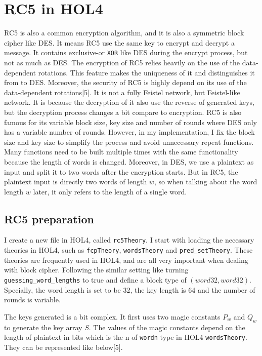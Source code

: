 \documentclass{article}
\begin{document}
\section{RC5 in HOL4}
RC5 is also a common encryption algorithm, and it is also a symmetric block cipher like DES. It means RC5 use the same key
to encrypt and decrypt a message. It contains exclusive-or \verb|XOR| like DES during the encrypt process, but not as much as
DES. The encryption of RC5 relies heavily on the use of the data-dependent rotations. This feature makes the uniqueness of it
and distinguishes it from to DES. Moreover, the security of RC5 is highly depend on its use of the data-dependent rotations[5].
It is not a fully Feistel network, but Feistel-like network. It is because the decryption of it also use the reverse of generated
keys, but the decryption process changes a bit compare to encryption. RC5 is also famous for its variable block size, key size and
number of rounds where DES only has a variable number of rounds. However, in my implementation, I fix the block size and key size
to simplify the process and avoid unnecessary repeat functions. Many functions need to be built multiple times with the same
functionality because the length of words is changed. Moreover, in DES, we use a plaintext as input and split it to two words after
the encryption starts. But in RC5, the plaintext input is directly two words of length $w$, so when talking about the word length $w$ later,
it only refers to the length of a single word.

\subsection{RC5 preparation}
I create a new file in HOL4, called \verb|rc5Theory|. I start with loading the necessary theories in HOL4, such as \verb|fcpTheory|,
\verb|wordsTheory| and \verb|pred_setTheory|. These theories are frequently used in HOL4, and are all very important when dealing with
block cipher. Following the similar setting like turning \verb|guessing_word_lengths| to true and define a block type of $(word32,word32)$.
Specially, the word length is set to be 32, the key length is 64 and the number of rounds is variable.

The keys generated is a bit complex. It first uses two magic constants $P_w$ and $Q_w$ to generate the key array $S$. The values of
the magic constants depend on the length of plaintext in bits which is the n of \verb|wordn| type in HOL4 \verb|wordsTheory|. They
can be represented like below[5].
\end{document}

